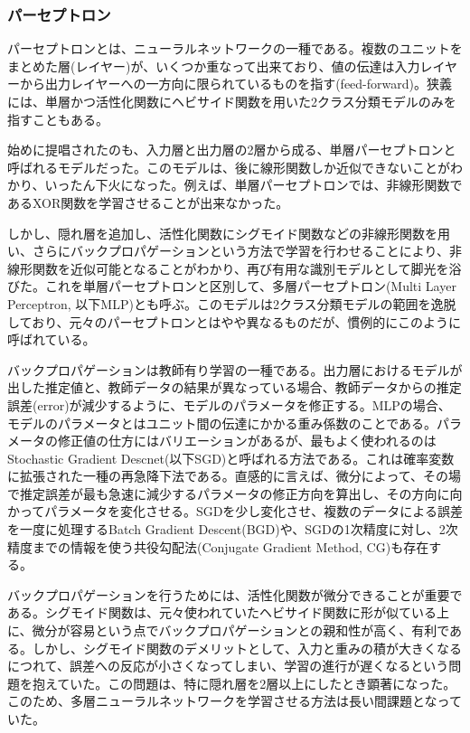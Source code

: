 \subsubsection{パーセプトロン}
パーセプトロンとは、ニューラルネットワークの一種である。複数のユニットをまとめた層(レイヤー)が、いくつか重なって出来ており、値の伝達は入力レイヤーから出力レイヤーへの一方向に限られているものを指す(feed-forward)。狭義には、単層かつ活性化関数にヘビサイド関数を用いた2クラス分類モデルのみを指すこともある。\par
始めに提唱されたのも、入力層と出力層の2層から成る、単層パーセプトロンと呼ばれるモデルだった\cite{rosenblatt1958perceptron}。このモデルは、後に線形関数しか近似できないことがわかり、いったん下火になった\cite{minsky1988perceptrons:}。例えば、単層パーセプトロンでは、非線形関数であるXOR関数を学習させることが出来なかった。\par
しかし、隠れ層を追加し、活性化関数にシグモイド関数などの非線形関数を用い、さらにバックプロパゲーションという方法で学習を行わせることにより、非線形関数を近似可能となることがわかり、再び有用な識別モデルとして脚光を浴びた\cite{rumelhart1986learning}。これを単層パーセプトロンと区別して、多層パーセプトロン(Multi Layer Perceptron, 以下MLP)とも呼ぶ。このモデルは2クラス分類モデルの範囲を逸脱しており、元々のパーセプトロンとはやや異なるものだが、慣例的にこのように呼ばれている。\par
バックプロパゲーションは教師有り学習の一種である。出力層におけるモデルが出した推定値と、教師データの結果が異なっている場合、教師データからの推定誤差(error)が減少するように、モデルのパラメータを修正する。MLPの場合、モデルのパラメータとはユニット間の伝達にかかる重み係数のことである。パラメータの修正値の仕方にはバリエーションがあるが、最もよく使われるのはStochastic Gradient Descnet(以下SGD)と呼ばれる方法である。これは確率変数に拡張された一種の再急降下法である。直感的に言えば、微分によって、その場で推定誤差が最も急速に減少するパラメータの修正方向を算出し、その方向に向かってパラメータを変化させる。SGDを少し変化させ、複数のデータによる誤差を一度に処理するBatch Gradient Descent(BGD)や、SGDの1次精度に対し、2次精度までの情報を使う共役勾配法(Conjugate Gradient Method, CG)も存在する。\par
バックプロパゲーションを行うためには、活性化関数が微分できることが重要である。シグモイド関数は、元々使われていたヘビサイド関数に形が似ている上に、微分が容易という点でバックプロパゲーションとの親和性が高く、有利である。しかし、シグモイド関数のデメリットとして、入力と重みの積が大きくなるにつれて、誤差への反応が小さくなってしまい、学習の進行が遅くなるという問題を抱えていた。この問題は、特に隠れ層を2層以上にしたとき顕著になった。このため、多層ニューラルネットワークを学習させる方法は長い間課題となっていた。